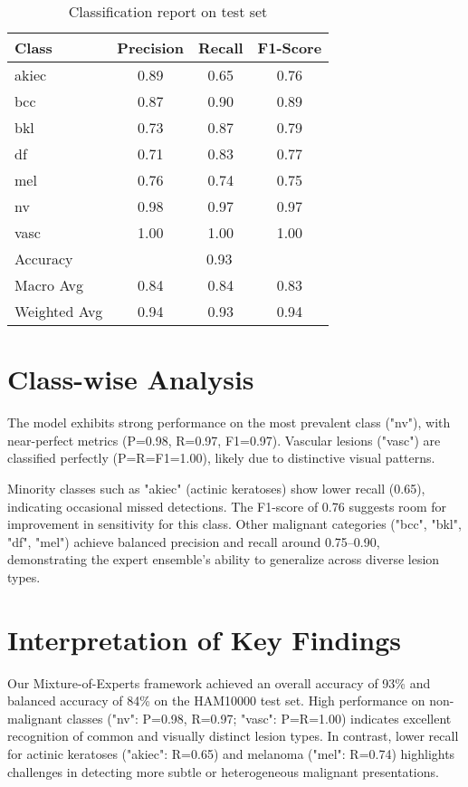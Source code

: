 \begin{table}[h!]
  \centering
  \caption{Classification report on test set}
  \label{tab:classification-report}
  \begin{tabular}{lccc}
    \hline
    Class & Precision & Recall & F1-Score \\
    \hline
    akiec  & 0.89 & 0.65 & 0.76 \\
    bcc    & 0.87 & 0.90 & 0.89 \\
    bkl    & 0.73 & 0.87 & 0.79 \\
    df     & 0.71 & 0.83 & 0.77 \\
    mel    & 0.76 & 0.74 & 0.75 \\
    nv     & 0.98 & 0.97 & 0.97 \\
    vasc   & 1.00 & 1.00 & 1.00 \\
    \hline
    Accuracy      & \multicolumn{3}{c}{0.93} \\
    Macro Avg     & 0.84 & 0.84 & 0.83 \\
    Weighted Avg  & 0.94 & 0.93 & 0.94 \\
    \hline
  \end{tabular}
\end{table}



\section{Class-wise Analysis}
The model exhibits strong performance on the most prevalent class ("nv"), with near-perfect metrics (P=0.98, R=0.97, F1=0.97). Vascular lesions ("vasc") are classified perfectly (P=R=F1=1.00), likely due to distinctive visual patterns.

Minority classes such as "akiec" (actinic keratoses) show lower recall (0.65), indicating occasional missed detections. The F1-score of 0.76 suggests room for improvement in sensitivity for this class. Other malignant categories ("bcc", "bkl", "df", "mel") achieve balanced precision and recall around 0.75--0.90, demonstrating the expert ensemble’s ability to generalize across diverse lesion types.

\section{Interpretation of Key Findings}
Our Mixture-of-Experts framework achieved an overall accuracy of 93\% and balanced accuracy of 84\% on the HAM10000 test set. High performance on non-malignant classes ("nv": P=0.98, R=0.97; "vasc": P=R=1.00) indicates excellent recognition of common and visually distinct lesion types. In contrast, lower recall for actinic keratoses ("akiec": R=0.65) and melanoma ("mel": R=0.74) highlights challenges in detecting more subtle or heterogeneous malignant presentations.

